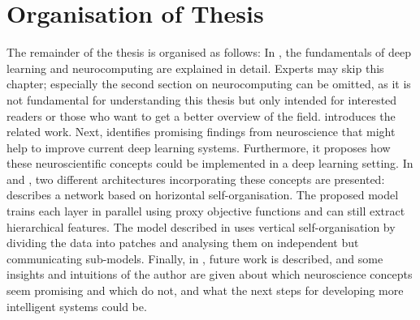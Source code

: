 \section{Organisation of Thesis}
The remainder of the thesis is organised as follows: In , the fundamentals of deep learning and neurocomputing are explained in detail.
Experts may skip this chapter; especially the second section on neurocomputing can be omitted, as it is not fundamental for understanding this thesis but only intended for interested readers or those who want to get a better overview of the field.
 introduces the related work. Next,  identifies promising findings from neuroscience that might help to improve current deep learning systems. Furthermore, it proposes how these neuroscientific concepts could be implemented in a deep learning setting.
In  and , two different architectures incorporating these concepts are presented:
 describes a network based on horizontal self-organisation. The proposed model trains each layer in parallel using proxy objective functions and can still extract hierarchical features.
The model described in  uses vertical self-organisation by dividing the data into patches and analysing them on independent but communicating sub-models.
Finally, in , future work is described, and some insights and intuitions of the author are given about which neuroscience concepts seem promising and which do not, and what the next steps for developing more intelligent systems could be.





